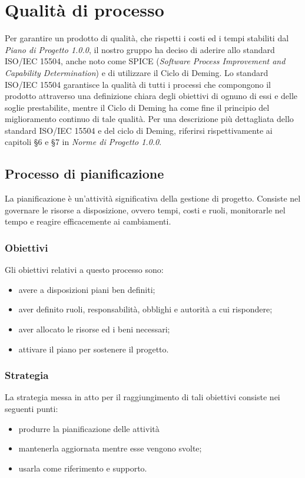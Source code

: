 \chapter{Qualità di processo}\label{QualitàDelProcesso}
Per garantire un prodotto di qualità, che rispetti i costi ed i tempi stabiliti dal \textit{Piano di Progetto 1.0.0}, il nostro gruppo ha deciso di aderire allo standard ISO/IEC 15504, anche noto come SPICE (\textit{Software Process Improvement and Capability Determination}) e di utilizzare il Ciclo di Deming.
Lo standard ISO/IEC 15504 garantisce la qualità di tutti i processi che compongono il prodotto attraverso una definizione chiara degli obiettivi di ognuno di essi e delle soglie prestabilite, mentre  il Ciclo di Deming ha come fine  il principio del miglioramento continuo di tale qualità.
Per una descrizione più dettagliata dello standard ISO/IEC 15504 e del ciclo di Deming,
riferirsi rispettivamente ai capitoli §6 e §7 in \textit{Norme di Progetto 1.0.0}.
\section{Processo di pianificazione}\label{2.1}
La pianificazione è un’attività significativa della gestione di progetto. 
Consiste nel governare le risorse a disposizione, ovvero tempi, costi e ruoli, monitorarle nel tempo e reagire efficacemente ai cambiamenti. 

\subsection{Obiettivi}\label{2.1.1}
Gli obiettivi relativi a questo processo sono:
\begin{itemize}
	\item avere a disposizioni piani ben definiti;
	\item aver definito ruoli, responsabilità, obblighi e autorità a cui rispondere;
	\item aver allocato le risorse ed i beni necessari;
	\item attivare il piano per sostenere il progetto.
\end{itemize}

\subsection{Strategia}\label{2.1.2}
La strategia messa in atto per il raggiungimento di tali obiettivi consiste nei seguenti punti:
\begin{itemize}
	\item produrre la pianificazione delle attività
	\item mantenerla aggiornata mentre esse vengono svolte;
	\item usarla come riferimento e supporto.
\end{itemize}

